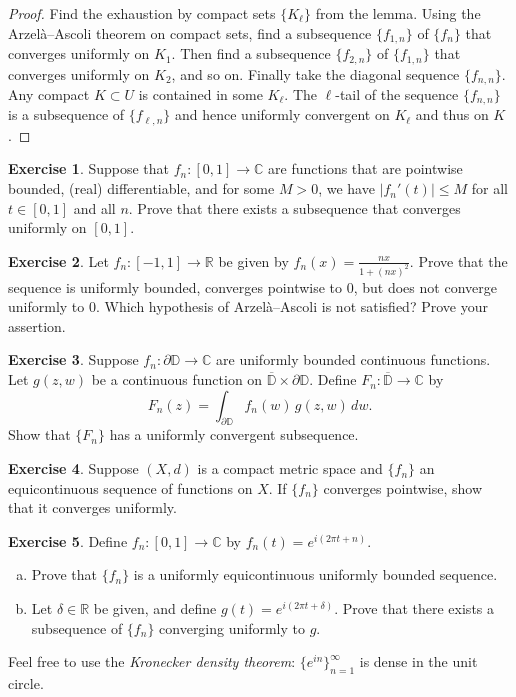 \documentclass[12pt,openany]{book}
\newcommand{\sabs}[1]{\lvert {#1} \rvert}
\newcommand{\C}{{\mathbb{C}}}
\newcommand{\R}{{\mathbb{R}}}
\newcommand{\D}{{\mathbb{D}}}
\newcommand{\myindex}[1]{#1\index{#1}}
\theoremstyle{plain}
\theoremstyle{remark}
\theoremstyle{definition}
\newenvironment{exbox}{%
    \def\FrameCommand{\vrule width 1pt \relax\hspace{10pt}}%
    \MakeFramed{\advance\hsize-\width\FrameRestore}%
}{%
    \endMakeFramed
}
\newenvironment{exparts}{%
    \leavevmode\begin{enumerate}[a),noitemsep,topsep=0pt,parsep=0pt,partopsep=0pt]
}{%
    \end{enumerate}
}
\theoremstyle{exercise}
\newtheorem{exercise}{Exercise}[section]
\theoremstyle{example}
\begin{document}
\begin{proof}
Find the exhaustion by compact sets $\{ K_\ell \}$ from the lemma.
Using the Arzel\`a--Ascoli theorem on compact sets,
find a subsequence $\{ f_{1,n} \}$  of $\{f_n\}$ that converges uniformly
on $K_1$.  Then find a subsequence
$\{ f_{2,n} \}$ of
$\{ f_{1,n} \}$ that converges uniformly on $K_2$, and so on.
Finally take the diagonal sequence $\{ f_{n,n} \}$.
Any compact $K \subset U$
is contained in some $K_\ell$.  The $\ell$-tail of the sequence $\{ f_{n,n}
\}$ is a subsequence of $\{ f_{\ell,n} \}$ and hence uniformly convergent on
$K_\ell$ and thus on $K$.
\end{proof}

\begin{exbox}
\begin{exercise}
Suppose that $f_n \colon [0,1] \to \C$ are functions that are pointwise
bounded, (real) differentiable, and for some $M> 0$, we have
$\sabs{f_n'(t)} \leq M$ for all $t \in [0,1]$ and all $n$.  Prove that there
exists a subsequence that converges uniformly on $[0,1]$.
\end{exercise}

\begin{exercise}
Let $f_n \colon [-1,1] \to \R$ be given by $f_n(x) = \frac{nx}{1+{(nx)}^2}$.
Prove that the sequence is uniformly bounded, converges pointwise to $0$, but
does not converge uniformly to $0$.
Which hypothesis of Arzel\`a--Ascoli
is not satisfied?  Prove your assertion.
\end{exercise}

\begin{exercise}
Suppose 
$f_n \colon \partial \D \to \C$ are uniformly bounded continuous functions.
Let $g(z,w)$ be a continuous function on $\overline{\D} \times \partial \D$.
Define
$F_n \colon \overline{\D} \to \C$ by
\begin{equation*}
F_n(z)  = \int_{\partial \D} f_n(w)\, g(z,w) \, dw . 
\end{equation*}
Show that $\{ F_n \}$ has a uniformly convergent subsequence.
\end{exercise}

\begin{exercise}
Suppose $(X,d)$ is a compact metric space and $\{ f_n \}$ an equicontinuous
sequence of functions on $X$.  If $\{ f_n \}$ converges
pointwise, show that it converges uniformly.
\end{exercise}

\begin{exercise}
Define $f_n \colon [0,1] \to \C$ by $f_n(t) = e^{i(2\pi t + n)}$.
\begin{exparts}
\item
Prove that $\{ f_n \}$ is a uniformly equicontinuous
uniformly bounded sequence.
\item
Let $\delta \in \R$ be given, and define $g(t) = e^{i(2\pi t + \delta)}$.
Prove that there exists 
a subsequence of $\{ f_n \}$ converging uniformly to $g$.
\end{exparts}
Feel free to use the \emph{\myindex{Kronecker density theorem}}:
$\{ e^{in} \}_{n=1}^\infty$ is dense in the unit circle.
\end{exercise}
\end{exbox}
\end{document}
